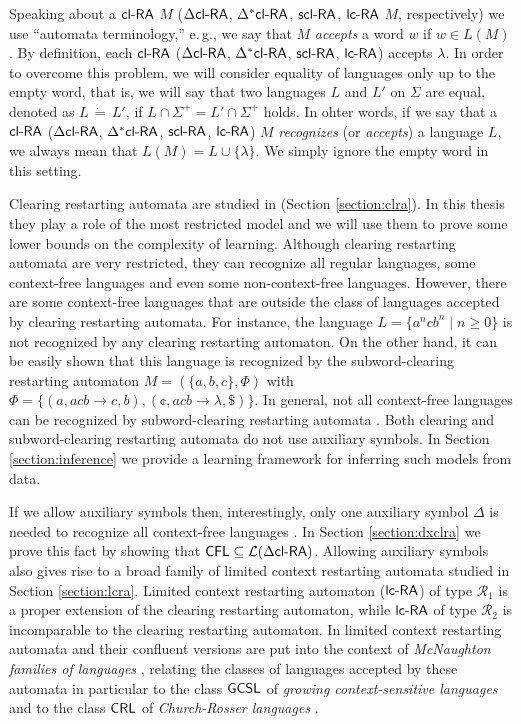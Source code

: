 \begin{remark}\label{remark:lambda}
Speaking about a $\textup{\sf cl-RA\/}$ $M$ ($\textup{\sf $\Delta$cl-RA\/}$, $\textup{\sf $\Delta^*$cl-RA\/}$, $\textup{\sf scl-RA}$, $\lcRA$ $M$, respectively) we use ``automata terminology,'' e.\,g., we say that $M$ \emph{accepts} a word $w$ if $w \in L(M)$. By definition, each $\textup{\sf cl-RA\/}$ ($\textup{\sf $\Delta$cl-RA\/}$, $\textup{\sf $\Delta^*$cl-RA\/}$, $\textup{\sf scl-RA}$, $\lcRA$) accepts $\lambda$. In order to overcome this problem, we will consider equality of languages only up to the empty word, that is, we will say that two languages $L$ and $L'$ on $\Sigma$ are equal, denoted as $L\, \dot{=}\, L'$, if $L\cap \Sigma^+ = L'\cap\Sigma^+$ holds. In ohter words, if we say that a $\textup{\sf cl-RA\/}$ ($\textup{\sf $\Delta$cl-RA\/}$, $\textup{\sf $\Delta^*$cl-RA\/}$, $\textup{\sf scl-RA}$, $\lcRA$) $M$ \emph{recognizes} (or \emph{accepts}) a language $L$, we always mean that $L(M) = L \cup \{\lambda\}$. We simply ignore the empty word in this setting.
\end{remark}

Clearing restarting automata are studied in \cite{CM10} (Section \ref{section:clra}). In this thesis they play a role of the most restricted model and we will use them to prove some lower bounds on the complexity of learning. Although clearing restarting automata are very restricted, they can recognize all regular languages, some context-free languages and even some non-context-free languages. However, there are some context-free languages that are outside the class of languages accepted by clearing restarting automata. For instance, the language $L = \{a^n c b^n \mid n \ge 0\}$ is not recognized by any clearing restarting automaton. On the other hand, it can be easily shown that this language is recognized by the subword-clearing restarting automaton $M = (\{a, b, c\}, \Phi)$ with $\Phi = \{(a, acb \to c, b), (\cent, acb \to \lambda, \$)\}$. In general, not all context-free languages can be recognized by subword-clearing restarting automata \cite{C13}. Both clearing and subword-clearing restarting automata do not use auxiliary symbols. In Section \ref{section:inference} we provide a learning framework for inferring such models from data.

If we allow auxiliary symbols then, interestingly, only one auxiliary symbol $\Delta$ is needed to recognize all context-free languages \cite{CM11}. In Section \ref{section:dxclra} we prove this fact by showing that $\textup{\sf CFL} \subseteq {\cal L}(\textup{\sf $\Delta$cl-RA\/})$. Allowing auxiliary symbols also gives rise to a broad family of limited context restarting automata studied in Section \ref{section:lcra}. Limited context restarting automaton ($\lcRA$) of type $\mathcal{R}_1$ is a proper extension of the clearing restarting automaton, while $\lcRA$ of type $\mathcal{R}_2$ is incomparable to the clearing restarting automaton. In \cite{OCM13} limited context restarting automata and their confluent versions are put into the context of \emph{McNaughton families of languages} \cite{Beaudry2003}, relating the classes of languages accepted by these automata in particular to the class $\textup{\sf GCSL}$ of \emph{growing context-sensitive languages} \cite{Buntrock19981,Dahlhaus1986} and to the class $\textup{\sf CRL}$ of \emph{Church-Rosser languages} \cite{MNO88}.

